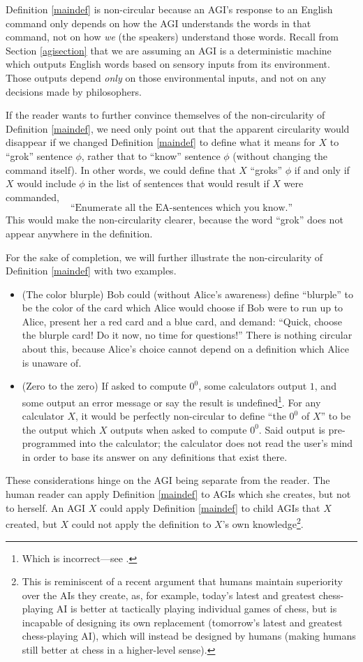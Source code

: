 \documentclass[runningheads]{llncs}
\begin{document}
Definition \ref{maindef} is non-circular because an AGI's response to an English
command only depends on how the AGI understands the words in that command, not
on how \emph{we} (the speakers) understand those words.
Recall from Section \ref{agisection}
that we are assuming an AGI is a deterministic machine which outputs English words
based on sensory inputs from its environment. Those outputs depend \emph{only} on those
environmental inputs, and not on any decisions made by philosophers.

If the reader wants to further convince themselves of the non-circularity of Definition
\ref{maindef}, we need only point out that the apparent circularity would disappear if
we changed Definition \ref{maindef} to define what it means for $X$ to ``grok'' sentence
$\phi$, rather that to ``know'' sentence $\phi$ (without changing the command itself).
In other words, we could define that $X$ ``groks'' $\phi$ if and only if $X$ would include
$\phi$ in the list of sentences that would result if $X$ were commanded,
  \[
  \text{``Enumerate all the EA-sentences which you know.''}
  \]
This would make the non-circularity clearer, because the word ``grok'' does not appear
anywhere in the definition.

For the sake of completion, we will further illustrate the non-circularity of
Definition \ref{maindef} with two examples.
\begin{itemize}
  \item
  (The color blurple) Bob could (without Alice's awareness) define ``blurple'' to be the
  color of the card
  which Alice would choose if Bob were to run up to Alice, present her a red card
  and a blue card, and demand: ``Quick, choose the blurple card! Do it now, no time
  for questions!'' There is nothing circular about this, because Alice's choice
  cannot depend on a definition which Alice is unaware of.
  \item
  (Zero to the zero) If asked to compute $0^0$, some calculators output $1$, and some
  output an error message or say the result is undefined\footnote{Which is incorrect---see
  \cite{knuth}.}. For any calculator $X$, it
  would be perfectly non-circular to define ``the $0^0$ of $X$'' to be the output which
  $X$ outputs when asked to compute $0^0$. Said output is pre-programmed into the
  calculator; the calculator does not read the user's mind in order to base its answer
  on any definitions that exist there.
\end{itemize}

These considerations hinge on the AGI being separate from the reader.
The human reader can apply Definition \ref{maindef} to AGIs which she
creates, but not to herself. An AGI $X$ could apply Definition \ref{maindef} to child
AGIs that $X$ created, but $X$ could not apply the definition to $X$'s
own knowledge\footnote{This is reminiscent of a recent argument \cite{maguire2020people}
that humans maintain superiority over the AIs they create, as, for example,
today's latest and greatest chess-playing AI is better at tactically playing individual
games of chess, but is incapable of designing its own replacement (tomorrow's latest
and greatest chess-playing AI), which will instead be designed by humans (making humans
still better at chess in a higher-level sense).}.
\end{document}
